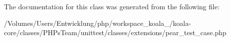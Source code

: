 The documentation for this class was generated from the following file:\begin{DoxyCompactItemize}
\item 
/Volumes/Users/Entwicklung/php/workspace\_\-koala\_/koala-\/core/classes/PHPsTeam/unittest/classes/extensions/pear\_\-test\_\-case.php\end{DoxyCompactItemize}
